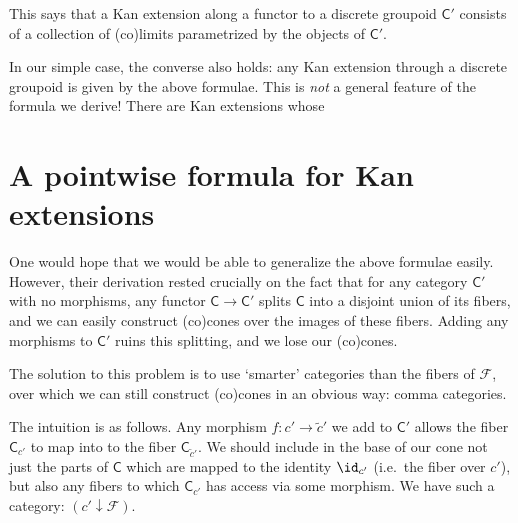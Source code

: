 \documentclass[notes.tex]{subfiles}
\begin{document}
This says that a Kan extension along a functor to a discrete groupoid $\mathsf{C}'$ consists of a collection of (co)limits parametrized by the objects of $\mathsf{C}'$.

\begin{note}
  In our simple case, the converse also holds: any Kan extension through a discrete groupoid is given by the above formulae. This is \emph{not} a general feature of the formula we derive! There are Kan extensions whose
\end{note}

\section{A pointwise formula for Kan extensions}
\label{sec:a_pointwise_formula_for_kan_extensions}

One would hope that we would be able to generalize the above formulae easily. However, their derivation rested crucially on the fact that for any category $\mathsf{C}'$ with no morphisms, any functor $\mathsf{C} \to \mathsf{C}'$ splits $\mathsf{C}$ into a disjoint union of its fibers, and we can easily construct (co)cones over the images of these fibers. Adding any morphisms to $\mathsf{C}'$ ruins this splitting, and we lose our (co)cones.

The solution to this problem is to use `smarter' categories than the fibers of $\mathcal{F}$, over which we can still construct (co)cones in an obvious way: comma categories.

The intuition is as follows. Any morphism $f\colon c' \to \tilde{c}'$ we add to $\mathsf{C}'$ allows the fiber $\mathsf{C}_{c'}$ to map into to the fiber $\mathsf{C}_{\tilde{c}'}$. We should include in the base of our cone not just the parts of $\mathsf{C}$ which are mapped to the identity $\id_{c'}$ (i.e.\ the fiber over $c'$), but also any fibers to which $\mathsf{C}_{c'}$ has access via some morphism. We have such a category: $(c' \downarrow \mathcal{F})$.
\end{document}
